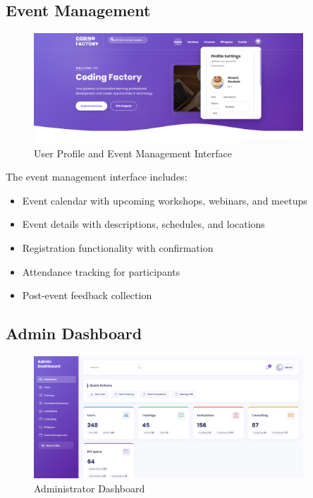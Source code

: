 \documentclass[12pt,a4paper]{report}
\begin{document}
\subsection{Event Management}

\begin{figure}[!htbp]
\centering
\includegraphics[width=0.9\textwidth]{media/profile.png}
\caption{User Profile and Event Management Interface}
\label{fig:event-interface}
\end{figure}

The event management interface includes:

\begin{itemize}
    \item Event calendar with upcoming workshops, webinars, and meetups
    \item Event details with descriptions, schedules, and locations
    \item Registration functionality with confirmation
    \item Attendance tracking for participants
    \item Post-event feedback collection
\end{itemize}

\subsection{Admin Dashboard}

\begin{figure}[!htbp]
\centering
\includegraphics[width=0.9\textwidth]{media/admin dashboard.png}
\caption{Administrator Dashboard}
\label{fig:admin-dashboard}
\end{figure}
\end{document}
